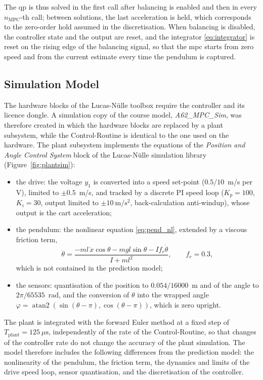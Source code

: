 The \ac{qp} is thus solved in the first call after balancing is enabled and
then in every $n_{\mathrm{MPC}}$-th call; between solutions, the last
acceleration is held, which corresponds to the zero-order hold assumed in the
discretisation. When balancing is disabled, the controller state and the
output are reset, and the integrator \eqref{eq:integrator} is reset on the
rising edge of the balancing signal, so that the \ac{mpc} starts from zero
speed and from the current estimate every time the pendulum is captured.

\subsection{Simulation Model}
\label{subsec:simmodel}

The hardware blocks of the Lucas-Nülle toolbox require the controller and its
licence dongle. A simulation copy of the course model,
\emph{A62\_MPC\_Sim}, was therefore created in which the hardware blocks are
replaced by a plant subsystem, while the Control-Routine is identical to the
one used on the hardware. The plant subsystem implements the equations of the
\emph{Position and Angle Control System} block of the Lucas-Nülle simulation
library~\cite{ln_manual} (Figure~\ref{fig:plantsim}):
\begin{itemize}
  \item the drive: the voltage $y_1$ is converted into a speed set-point
        ($0.5/10$~m/s per V), limited to $\pm 0.5$~m/s, and tracked by a
        discrete PI speed loop ($K_p = 100$, $K_i = 30$, output limited to
        $\pm 10~\mathrm{m/s^2}$, back-calculation anti-windup), whose output is
        the cart acceleration;
  \item the pendulum: the nonlinear equation \eqref{eq:pend_nl}, extended by a
        viscous friction term,
        \begin{equation}
          \ddot{\theta} = \frac{-ml\,\ddot{x}\cos\theta - mgl\sin\theta
                                - I f_r\dot{\theta}}{I + ml^2},
          \qquad f_r = 0.3,
          \label{eq:plant_sim}
        \end{equation}
        which is not contained in the prediction model;
  \item the sensors: quantisation of the position to $0.054/16000$~m and of
        the angle to $2\pi/65535$~rad, and the conversion of $\theta$ into the
        wrapped angle $\varphi = \operatorname{atan2}(\sin(\theta-\pi),
        \cos(\theta-\pi))$, which is zero upright.
\end{itemize}
The plant is integrated with the forward Euler method at a fixed step of
$T_{\mathrm{plant}} = 125~\mu\mathrm{s}$, independently of the rate of the
Control-Routine, so that changes of the controller rate do not change the
accuracy of the plant simulation. The model therefore includes the following
differences from the prediction model: the nonlinearity of the pendulum, the
friction term, the dynamics and limits of the drive speed loop, sensor
quantisation, and the discretisation of the controller.

